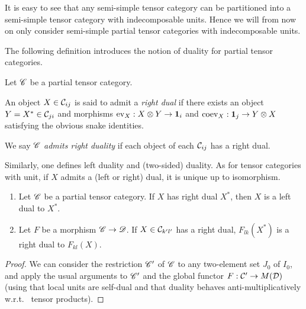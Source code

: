 It is easy to see that any semi-simple tensor category can be partitioned into a semi-simple tensor category with indecomposable units.  Hence we will from now on only consider semi-simple partial tensor categories with indecomposable units.


 

The following definition introduces the notion of duality for partial tensor categories.

\begin{Def} Let $\mathscr{C}$ be a partial tensor category. 

An object $X\in \mathcal{C}_{ij}$ is said to admit a \emph{right dual} if there exists an object $Y=X^* \in \mathcal{C}_{ji}$ and morphisms $\mathrm{ev}_{X}: X\otimes Y \rightarrow \mathbf{1}_i$ and $\mathrm{coev}_X: \mathbf{1}_j\rightarrow Y\otimes X$ satisfying the obvious snake identities.

We say $\mathscr{C}$ \emph{admits right duality} if each object of each $\mathcal{C}_{ij}$ has a right dual.
\end{Def}

Similarly, one defines left duality and (two-sided) duality. As for tensor categories with unit, if $X$ admits a (left or right) dual, it is unique up to isomorphism. 

\begin{Lem}\label{LemMorDua}
\begin{enumerate}
\item Let $\mathscr{C}$ be a partial tensor category. If $X$ has right dual $X^*$, then $X$ is a left dual to $X^*$. 
\item Let $F$ be a morphism $\mathscr{C}\rightarrow \mathscr{D}$. If $X\in \mathcal{C}_{k'l'}$ has a right dual, $F_{lk}(X^*)$ is a right dual to $F_{kl}(X)$.
 \end{enumerate}
\end{Lem}
\begin{proof}
We can consider the restriction $\mathscr{C}'$ of $\mathscr{C}$ to any two-element set $J_0$ of $I_0$, and apply the  usual arguments to $\mathscr{C}'$ and the global functor $F:\mathcal{C}'\rightarrow M(\mathcal{D})$ (using that local units are self-dual and that duality behaves anti-multiplicatively w.r.t.~ tensor products). %
\end{proof}

